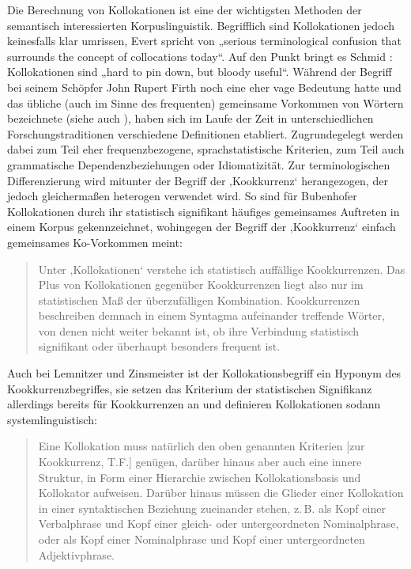 Die Berechnung von Kollokationen ist eine der wichtigsten Methoden der semantisch interessierten Korpuslinguistik. Begrifflich sind Kollokationen jedoch keinesfalls klar umrissen, Evert \autocite*[15]{evertStatisticsWordCooccurrences2005} spricht von „serious terminological confusion that surrounds the concept of collocations today``. Auf den Punkt bringt es Schmid \autocite*[235]{schmidCollocationHardPin2003}: Kollokationen sind „hard to pin down, but bloody useful``. Während der Begriff bei seinem Schöpfer John Rupert Firth \autocite*[194-195]{firthPapersLinguistics193419511957} noch eine eher vage Bedeutung hatte und das übliche (auch im Sinne des frequenten) gemeinsame Vorkommen von Wörtern bezeichnete (siehe auch ), haben sich im Laufe der Zeit in unterschiedlichen Forschungstraditionen verschiedene Definitionen etabliert. Zugrundegelegt werden dabei zum Teil eher frequenzbezogene, sprachstatistische Kriterien, zum Teil auch grammatische Dependenzbeziehungen oder Idiomatizität. Zur terminologischen Differenzierung wird mitunter der Begriff der ‚Kookkurrenz` herangezogen, der jedoch gleichermaßen heterogen verwendet wird. So sind für Bubenhofer Kollokationen durch ihr statistisch signifikant häufiges gemeinsames Auftreten in einem Korpus gekennzeichnet, wohingegen der Begriff der ‚Kookkurrenz` einfach gemeinsames Ko-Vorkommen meint:

\begin{quote}
Unter ‚Kollokationen` verstehe ich statistisch auffällige Kookkurrenzen. Das Plus von Kollokationen gegenüber Kookkurrenzen liegt also nur im statistischen Maß der überzufälligen Kombination. Kookkurrenzen beschreiben demnach in einem Syntagma aufeinander treffende Wörter, von denen nicht weiter bekannt ist, ob ihre Verbindung statistisch signifikant oder überhaupt besonders frequent ist. \autocite[122]{bubenhoferSprachgebrauchsmusterKorpuslinguistikAls2009}
\end{quote}

Auch bei Lemnitzer und Zinsmeister ist der Kollokationsbegriff ein Hyponym des Kookkurrenzbegriffes, sie setzen das Kriterium der statistischen Signifikanz allerdings bereits für Kookkurrenzen an und definieren Kollokationen sodann systemlinguistisch:

\begin{quote}
Eine Kollokation muss natürlich den oben genannten Kriterien {[}zur Kookkurrenz, T.F.{]} genügen, darüber hinaus aber auch eine innere Struktur, in Form einer Hierarchie zwischen Kollokationsbasis und Kollokator aufweisen. Darüber hinaus müssen die Glieder einer Kollokation in einer syntaktischen Beziehung zueinander stehen, z.\,B. als Kopf einer Verbalphrase und Kopf einer gleich- oder untergeordneten Nominalphrase, oder als Kopf einer Nominalphrase und Kopf einer untergeordneten Adjektivphrase. \autocite[179]{lemnitzerKorpuslinguistikEinfuhrung2015}
\end{quote}

